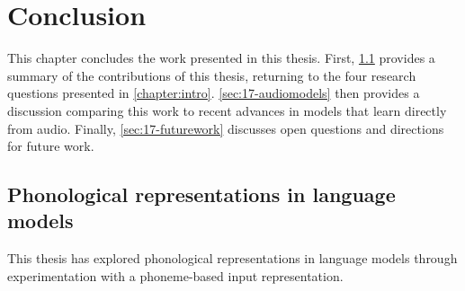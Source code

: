 \chapter{Conclusion}\label{chapter:conclusion}

This chapter concludes the work presented in this thesis. First, \cref{sec:17-summary} provides a summary of the contributions of this thesis, returning to the four research questions presented in \cref{chapter:intro}. \cref{sec:17-audiomodels} then provides a discussion comparing this work to recent advances in models that learn directly from audio. Finally, \cref{sec:17-futurework} discusses open questions and directions for future work.

\section{Phonological representations in language models}
\label{sec:17-summary}

This thesis has explored phonological representations in language models through experimentation with a phoneme-based input representation. 






